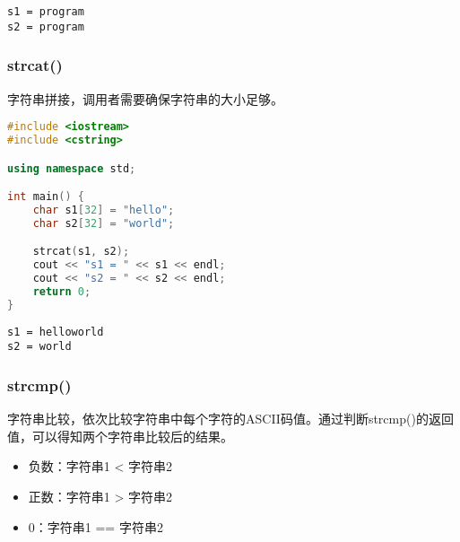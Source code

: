 \begin{tcolorbox}
	\begin{verbatim}
s1 = program
s2 = program
	\end{verbatim}
\end{tcolorbox}

\vspace{0.5cm}

\subsubsection{strcat()}

字符串拼接，调用者需要确保字符串的大小足够。\\


\begin{lstlisting}[language=C++]
#include <iostream>
#include <cstring>

using namespace std;

int main() {
	char s1[32] = "hello";
	char s2[32] = "world";

	strcat(s1, s2);
	cout << "s1 = " << s1 << endl;
	cout << "s2 = " << s2 << endl;
	return 0;
}
\end{lstlisting}

\begin{tcolorbox}
	\begin{verbatim}
s1 = helloworld
s2 = world
	\end{verbatim}
\end{tcolorbox}

\vspace{0.5cm}

\subsubsection{strcmp()}

字符串比较，依次比较字符串中每个字符的ASCII码值。通过判断strcmp()的返回值，可以得知两个字符串比较后的结果。

\begin{itemize}
	\item 负数：字符串1 < 字符串2
	\item 正数：字符串1 > 字符串2
	\item 0：字符串1 == 字符串2
\end{itemize}

\vspace{0.5cm}


